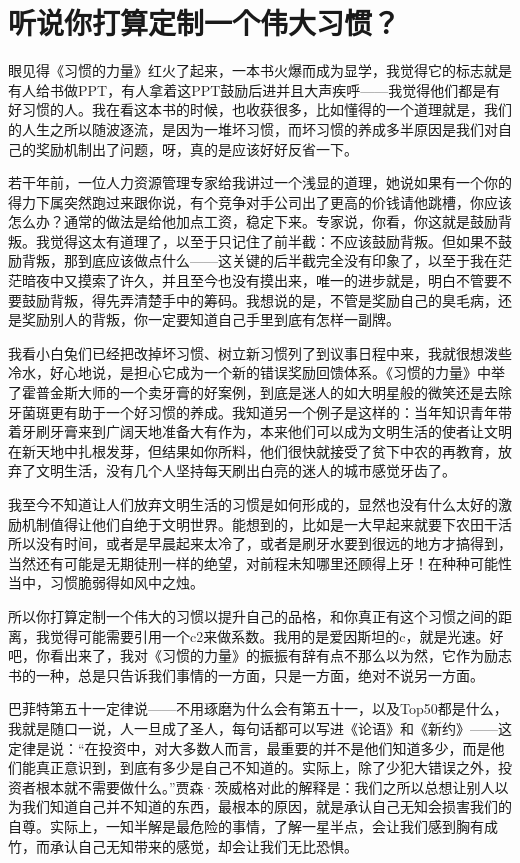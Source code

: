 \section{听说你打算定制一个伟大习惯？}

眼见得《习惯的力量》红火了起来，一本书火爆而成为显学，我觉得它的标志就是有人给书做PPT，有人拿着这PPT鼓励后进并且大声疾呼------我觉得他们都是有好习惯的人。我在看这本书的时候，也收获很多，比如懂得的一个道理就是，我们的人生之所以随波逐流，是因为一堆坏习惯，而坏习惯的养成多半原因是我们对自己的奖励机制出了问题，呀，真的是应该好好反省一下。

若干年前，一位人力资源管理专家给我讲过一个浅显的道理，她说如果有一个你的得力下属突然跑过来跟你说，有个竞争对手公司出了更高的价钱请他跳槽，你应该怎么办？通常的做法是给他加点工资，稳定下来。专家说，你看，你这就是鼓励背叛。我觉得这太有道理了，以至于只记住了前半截：不应该鼓励背叛。但如果不鼓励背叛，那到底应该做点什么------这关键的后半截完全没有印象了，以至于我在茫茫暗夜中又摸索了许久，并且至今也没有摸出来，唯一的进步就是，明白不管要不要鼓励背叛，得先弄清楚手中的筹码。我想说的是，不管是奖励自己的臭毛病，还是奖励别人的背叛，你一定要知道自己手里到底有怎样一副牌。

我看小白兔们已经把改掉坏习惯、树立新习惯列了到议事日程中来，我就很想泼些冷水，好心地说，是担心它成为一个新的错误奖励回馈体系。《习惯的力量》中举了霍普金斯大师的一个卖牙膏的好案例，到底是迷人的如大明星般的微笑还是去除牙菌斑更有助于一个好习惯的养成。我知道另一个例子是这样的：当年知识青年带着牙刷牙膏来到广阔天地准备大有作为，本来他们可以成为文明生活的使者让文明在新天地中扎根发芽，但结果如你所料，他们很快就接受了贫下中农的再教育，放弃了文明生活，没有几个人坚持每天刷出白亮的迷人的城市感觉牙齿了。

我至今不知道让人们放弃文明生活的习惯是如何形成的，显然也没有什么太好的激励机制值得让他们自绝于文明世界。能想到的，比如是一大早起来就要下农田干活所以没有时间，或者是早晨起来太冷了，或者是刷牙水要到很远的地方才搞得到，当然还有可能是无期徒刑一样的绝望，对前程未知哪里还顾得上牙！在种种可能性当中，习惯脆弱得如风中之烛。

所以你打算定制一个伟大的习惯以提升自己的品格，和你真正有这个习惯之间的距离，我觉得可能需要引用一个c2来做系数。我用的是爱因斯坦的c，就是光速。好吧，你看出来了，我对《习惯的力量》的振振有辞有点不那么以为然，它作为励志书的一种，总是只告诉我们事情的一方面，只是一方面，绝对不说另一方面。

巴菲特第五十一定律说------不用琢磨为什么会有第五十一，以及Top50都是什么，我就是随口一说，人一旦成了圣人，每句话都可以写进《论语》和《新约》------这定律是说：``在投资中，对大多数人而言，最重要的并不是他们知道多少，而是他们能真正意识到，到底有多少是自己不知道的。实际上，除了少犯大错误之外，投资者根本就不需要做什么。''贾森·茨威格对此的解释是：我们之所以总想让别人以为我们知道自己并不知道的东西，最根本的原因，就是承认自己无知会损害我们的自尊。实际上，一知半解是最危险的事情，了解一星半点，会让我们感到胸有成竹，而承认自己无知带来的感觉，却会让我们无比恐惧。

